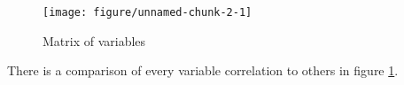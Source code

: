 \documentclass{article}\usepackage[]{graphicx}\usepackage[]{color}
\newenvironment{knitrout}{}{} %
\begin{document}
\begin{figure}
\begin{center}
\begin{knitrout}
\color{fgcolor}
\texttt{[image: figure/unnamed-chunk-2-1]} 

\end{knitrout}
\caption{Matrix of variables}
\label{matrix}
\end{center}
\end{figure}

There is a comparison of every variable correlation to others in figure \ref{matrix}.

\end{document}
